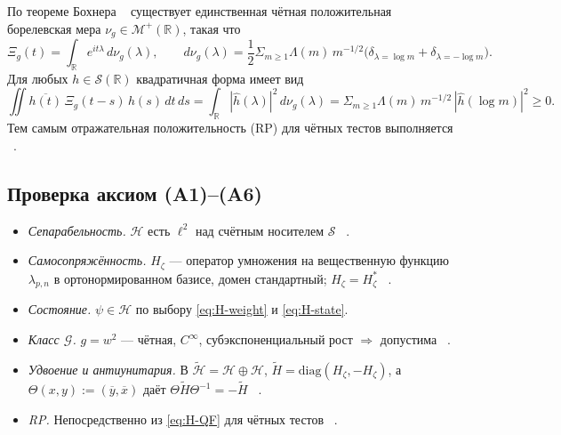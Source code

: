 \documentclass{article}
\numberwithin{equation}{section}
\theoremstyle{plain}
\theoremstyle{definition}
\theoremstyle{remark}
\def\Rightarrow{⇒}%
\def\delta{δ}\def\Delta{Δ}\def\epsilon{ε}\def\zeta{ζ}%
\def\infty{∞}\def\partial{∂}\def\sum{Σ}\def\int{∫}%
\begin{document}
По теореме Бохнера ~\cite{Bochner1933, RudinHA} существует единственная чётная положительная борелевская мера \(\nu_g\in\mathcal M^+(\mathbb R)\), такая что
\begin{equation}\label{eq:H-nu}
\Xi_g(t)=\int_{\mathbb R} e^{it\lambda}\,d\nu_g(\lambda),\qquad 
d\nu_g(\lambda)=\frac12\sum_{m\ge 1}\Lambda(m)\,m^{-1/2}\big(\delta_{\lambda=\log m}+\delta_{\lambda=-\log m}\big).
\end{equation}
Для любых \(h\in\mathcal S(\mathbb R)\) квадратичная форма имеет вид
\begin{equation}\label{eq:H-QF}
\iint \overline{h(t)}\,\Xi_g(t-s)\,h(s)\,dt\,ds
=\int_{\mathbb R}|\widehat h(\lambda)|^2\,d\nu_g(\lambda)
=\sum_{m\ge 1}\Lambda(m)\,m^{-1/2}\,|\widehat h(\log m)|^2\ge 0.
\end{equation}
Тем самым отражательная положительность (RP) для чётных тестов выполняется ~\cite{OsterwalderSchrader1973, Jaffe2007}.

\subsection*{Проверка аксиом (A1)–(A6)}

\begin{itemize}
\item[(A1)] \emph{Сепарабельность.} \(\mathcal H\) есть \(\ell^2\) над счётным носителем \(\mathcal S\) ~\cite{ReedSimonI}.
\item[(A2)] \emph{Самосопряжённость.} \(H_\zeta\) — оператор умножения на вещественную функцию \(\lambda_{p,n}\) в ортонормированном базисе, домен стандартный; \(H_\zeta=H_\zeta^\ast\) ~\cite{ReedSimonII, Kato1995}.
\item[(A3)] \emph{Состояние.} \(\psi\in\mathcal H\) по выбору \eqref{eq:H-weight} и \eqref{eq:H-state}.
\item[(A4)] \emph{Класс \(\mathcal G\).} \(g=w^2\) — чётная, \(C^\infty\), субэкспоненциальный рост \(\Rightarrow\) допустима ~\cite{GelfandShilov1968}.
\item[(A5)] \emph{Удвоение и антиунитария.} В \(\widetilde{\mathcal H}=\mathcal H\oplus\mathcal H\), \(\widetilde H=\mathrm{diag}(H_\zeta,-H_\zeta)\), а \(\Theta(x,y):=(\overline{y},\overline{x})\) даёт \(\Theta\widetilde H\Theta^{-1}=-\widetilde H\) ~\cite{Haag1992}.
\item[(A6)] \emph{RP.} Непосредственно из \eqref{eq:H-QF} для чётных тестов ~\cite{OsterwalderSchrader1973, GlimmJaffe1987}.
\end{itemize}
\end{document}
